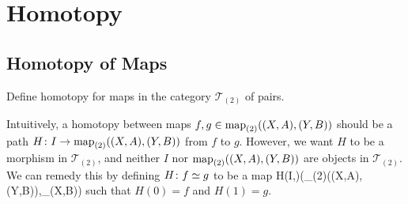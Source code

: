 \chapter{Homotopy}

\section{Homotopy of Maps}

\bx
Define homotopy for maps in the category $\mathcal{T}_{(2)}$ of pairs.
\ex

\bs
Intuitively, a homotopy between maps $f,g\in\operatorname{map}_{(2)}((X,A),(Y,B))$ should be a path $H\colon I\to\operatorname{map}_{(2)}((X,A),(Y,B))$ from $f$ to $g$. However, we want $H$ to be a morphism in $\mathcal{T}_{(2)}$, and neither $I$ nor $\operatorname{map}_{(2)}((X,A),(Y,B))$ are objects in $\mathcal{T}_{(2)}$. We can remedy this by defining $H\colon f\simeq g$ to be a map
\bse
H\cl (I,\vn)\longrightarrow (\map_{(2)}((X,A),(Y,B)),\map_{\circ}(X,B))
\ese
such that $H(0)=f$ and $H(1)=g$.
\es




















